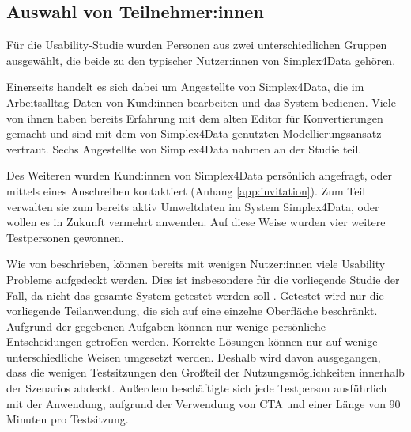 \subsection{Auswahl von Teilnehmer:innen}

Für die Usability-Studie wurden Personen aus zwei unterschiedlichen Gruppen ausgewählt, die beide zu den typischer Nutzer:innen von Simplex4Data gehören.

Einerseits handelt es sich dabei um Angestellte von Simplex4Data, die im Arbeitsalltag Daten von Kund:innen bearbeiten und das System bedienen. Viele von ihnen haben bereits Erfahrung mit dem alten Editor für Konvertierungen gemacht und sind mit dem von Simplex4Data genutzten Modellierungsansatz vertraut. Sechs Angestellte von Simplex4Data nahmen an der Studie teil.

Des Weiteren wurden Kund:innen von Simplex4Data persönlich angefragt, oder mittels eines Anschreiben kontaktiert (Anhang \ref{app:invitation}). Zum Teil verwalten sie zum bereits aktiv Umweltdaten im System Simplex4Data, oder wollen es in Zukunft vermehrt anwenden. Auf diese Weise wurden vier weitere Testpersonen gewonnen.

Wie von \textcite{nielsenWhyYou2000} beschrieben, können bereits mit wenigen Nutzer:innen viele Usability Probleme aufgedeckt werden. Dies ist insbesondere für die vorliegende Studie der Fall, da nicht das gesamte System getestet werden soll \parencite[Vgl. \ref{sec:formative-summative}]{spoolTestingWeb2001}. Getestet wird nur die vorliegende Teilanwendung, die sich auf eine einzelne Oberfläche beschränkt. Aufgrund der gegebenen Aufgaben können nur wenige persönliche Entscheidungen getroffen werden. Korrekte Lösungen können nur auf wenige unterschiedliche Weisen umgesetzt werden. Deshalb wird davon ausgegangen, dass die wenigen Testsitzungen den Großteil der Nutzungsmöglichkeiten innerhalb der Szenarios abdeckt. Außerdem beschäftigte sich jede Testperson ausführlich mit der Anwendung, aufgrund der Verwendung von \ac{CTA} und einer Länge von 90 Minuten pro Testsitzung.
